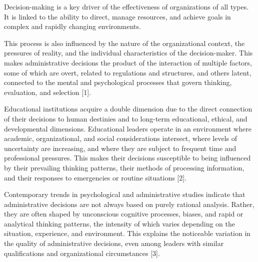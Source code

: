 \documentclass[10pt]{NSP1}
\begin{document}
\maketitle
\makeatletter
\let\newpage\JLTXorig@newpage
\let\clearpage\JLTXorig@clearpage
\let\cleardoublepage\JLTXorig@cleardoublepage
\makeatother





\par\vspace{6.0pt}\vspace{12.0pt}

Decision-making is a key driver of the effectiveness of organizations of all types. It is linked to the ability to direct, manage resources, and achieve goals in complex and rapidly changing environments.

This process is also influenced by the nature of the organizational context, the pressures of reality, and the individual characteristics of the decision-maker. This makes administrative decisions the product of the interaction of multiple factors, some of which are overt, related to regulations and structures, and others latent, connected to the mental and psychological processes that govern thinking, evaluation, and selection [1].

Educational institutions acquire a double dimension due to the direct connection of their decisions to human destinies and to long-term educational, ethical, and developmental dimensions. Educational leaders operate in an environment where academic, organizational, and social considerations intersect, where levels of uncertainty are increasing, and where they are subject to frequent time and professional pressures. This makes their decisions susceptible to being influenced by their prevailing thinking patterns, their methods of processing information, and their responses to emergencies or routine situations [2].

Contemporary trends in psychological and administrative studies indicate that administrative decisions are not always based on purely rational analysis. Rather, they are often shaped by unconscious cognitive processes, biases, and rapid or analytical thinking patterns, the intensity of which varies depending on the situation, experience, and environment. This explains the noticeable variation in the quality of administrative decisions, even among leaders with similar qualifications and organizational circumstances [3].
\end{document}
